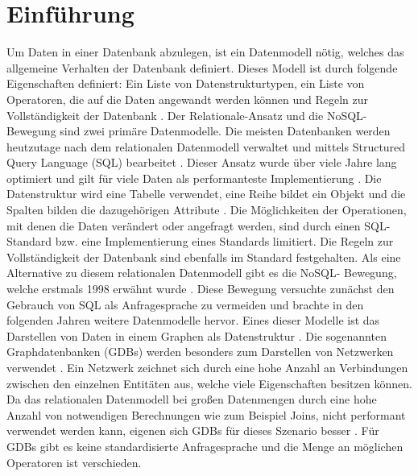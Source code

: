 
\chapter{Einführung} %

\label{Kaptiel1} %


\newcommand{\keyword}[1]{\textit{#1}}
\newcommand{\tabhead}[1]{\textbf{#1}}
\newcommand{\code}[1]{\texttt{#1}}
\newcommand{\file}[1]{\texttt{\bfseries#1}}
\newcommand{\option}[1]{\texttt{\itshape#1}}

Um Daten in einer Datenbank abzulegen, ist ein Datenmodell nötig, welches  das allgemeine Verhalten der Datenbank definiert. Dieses Modell ist durch folgende Eigenschaften definiert: Ein Liste von Datenstrukturtypen, ein Liste von Operatoren, die auf die Daten angewandt werden können und Regeln zur Vollständigkeit der Datenbank \parencite{codd1981data}. Der Relationale-Ansatz und die NoSQL-Bewegung sind zwei primäre Datenmodelle. Die meisten Datenbanken werden heutzutage nach dem relationalen Datenmodell verwaltet und mittels Structured Query Language (SQL) bearbeitet \parencite{miller2013graph}. Dieser Ansatz wurde über viele Jahre lang optimiert und gilt für viele Daten als performanteste Implementierung \parencite{miller2013graph}. Die Datenstruktur wird eine Tabelle verwendet, eine Reihe bildet ein Objekt und die Spalten bilden die dazugehörigen Attribute \parencite{miller2013graph}. Die Möglichkeiten der Operationen, mit denen die Daten verändert oder angefragt werden, sind durch einen SQL-Standard bzw. eine Implementierung eines Standards limitiert. Die Regeln zur Vollständigkeit der Datenbank sind ebenfalls im Standard festgehalten. \newline 
Als eine Alternative zu diesem relationalen Datenmodell gibt es die NoSQL- Bewegung, welche erstmals 1998 erwähnt wurde \parencite{strauch2011nosql}. Diese Bewegung versuchte zunächst den Gebrauch von SQL als Anfragesprache zu vermeiden und brachte in den folgenden Jahren weitere Datenmodelle hervor. Eines dieser Modelle ist das Darstellen von Daten in einem Graphen als Datenstruktur \parencite{miller2013graph}. Die sogenannten Graphdatenbanken (GDBs) werden besonders zum Darstellen von Netzwerken verwendet \parencite{han2011survey}. Ein Netzwerk zeichnet sich durch eine hohe Anzahl an Verbindungen zwischen den einzelnen Entitäten aus, welche viele Eigenschaften besitzen können. Da das relationalen Datenmodell bei großen Datenmengen durch eine hohe Anzahl von notwendigen Berechnungen wie zum Beispiel Joins, nicht performant verwendet werden kann, eigenen sich GDBs für dieses Szenario besser \parencite{miller2013graph}. Für GDBs gibt es keine standardisierte Anfragesprache und  die Menge an möglichen Operatoren ist verschieden.
